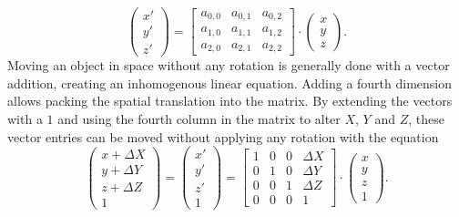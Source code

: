 \begin{equation*}
    \begin{pmatrix}
        x' \\
        y' \\
        z'
    \end{pmatrix}
    =
    \begin{bmatrix}
        a_{0,0} & a_{0,1} & a_{0,2} \\
        a_{1,0} & a_{1,1} & a_{1,2} \\
        a_{2,0} & a_{2,1} & a_{2,2}
    \end{bmatrix}
    \cdot
    \begin{pmatrix}
        x \\
        y \\
        z
    \end{pmatrix}.
\end{equation*}
Moving an object in space without any rotation is generally done with a vector addition, creating an inhomogenous linear equation. Adding a fourth dimension allows packing the spatial translation into the matrix. By extending the vectors with a $1$ and using the fourth column in the matrix to alter $X$, $Y$ and $Z$, these vector entries can be moved without applying any rotation with the equation
\begin{equation*}
    \begin{pmatrix}
        x+\Delta X \\
        y+\Delta Y \\
        z+\Delta Z \\
        1
    \end{pmatrix}
    =
    \begin{pmatrix}
        x' \\
        y' \\
        z' \\
        1
    \end{pmatrix}
    =
    \begin{bmatrix}
        1 & 0 & 0 & \Delta X \\
        0 & 1 & 0 & \Delta Y \\
        0 & 0 & 1 & \Delta Z \\
        0 & 0 & 0 & 1
    \end{bmatrix}
    \cdot
    \begin{pmatrix}
        x \\
        y \\
        z \\
        1
    \end{pmatrix}.
\end{equation*}
